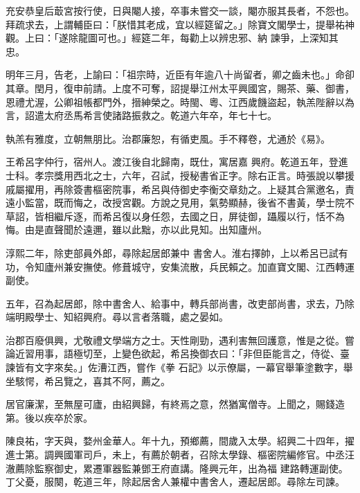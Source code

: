 \begin{pinyinscope}
 充安恭皇后菆宮按行使，日與閹人接，卒事未嘗交一談，閹亦服其長者，不怨也。拜疏求去，上謂輔臣曰：「朕惜其老成，宜以經筵留之。」除寶文閣學士，提舉祐神觀。上曰：「遂除龍圖可也。」經筵二年，每勸上以辨忠邪、納
 諫爭，上深知其忠。



 明年三月，告老，上諭曰：「祖宗時，近臣有年逾八十尚留者，卿之齒未也。」命卻其章。閏月，復申前請。上度不可奪，詔提舉江州太平興國宮，賜茶、藥、御書，恩禮尤渥，公卿祖帳都門外，搢紳榮之。時閩、粵、江西歲饑盜起，執羔陛辭以為言，詔遣太府丞馬希言使諸路振救之。乾道六年卒，年七十七。



 執羔有雅度，立朝無朋比。治郡廉恕，有循吏風。手不釋卷，尤通於《易》。



 王希呂字仲行，宿州人。渡江後自北歸南，既仕，寓居嘉
 興府。乾道五年，登進士科。孝宗獎用西北之士，六年，召試，授秘書省正字。除右正言。時張說以攀援戚屬擢用，再除簽書樞密院事，希呂與侍御史李衡交章劾之。上疑其合黨邀名，責遠小監當，既而悔之，改授宮觀。方說之見用，氣勢顯赫，後省不書黃，學士院不草詔，皆相繼斥逐，而希呂復以身任怨，去國之日，屏徒御，躡履以行，恬不為悔。由是直聲聞於遠邇，雖以此黜，亦以此見知。出知廬州。



 淳熙二年，除吏部員外郎，尋除起居郎兼中
 書舍人。淮右擇帥，上以希呂已試有功，令知廬州兼安撫使。修葺城守，安集流散，兵民賴之。加直寶文閣、江西轉運副使。



 五年，召為起居郎，除中書舍人、給事中，轉兵部尚書，改吏部尚書，求去，乃除端明殿學士、知紹興府。尋以言者落職，處之晏如。



 治郡百廢俱興，尤敬禮文學端方之士。天性剛勁，遇利害無回護意，惟是之從。嘗論近習用事，語極切至，上變色欲起，希呂換御衣曰：「非但臣能言之，侍從、臺諫皆有文字來矣。」佐漕江西，嘗作《拳
 石記》以示僚屬，一幕官舉筆塗數字，舉坐駭愕，希呂覽之，喜其不阿，薦之。



 居官廉潔，至無屋可廬，由紹興歸，有終焉之意，然猶寓僧寺。上聞之，賜錢造第。後以疾卒於家。



 陳良祐，字天與，婺州金華人。年十九，預鄉薦，間歲入太學。紹興二十四年，擢進士第。調興國軍司戶，未上，有薦於朝者，召除太學錄、樞密院編修官。中丞汪澈薦除監察御史，累遷軍器監兼鄧王府直講。隆興元年，出為福
 建路轉運副使。丁父憂，服闋，乾道三年，除起居舍人兼權中書舍人，遷起居郎。尋除左司諫。




\end{pinyinscope}
